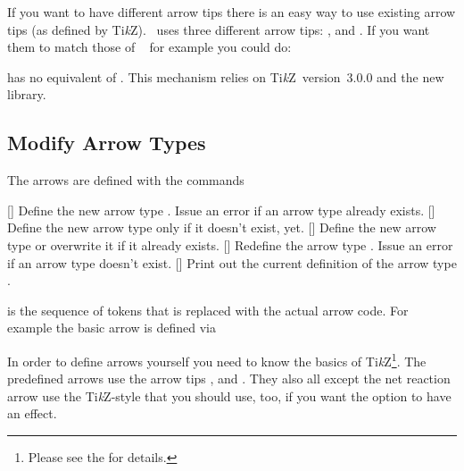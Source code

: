 \documentclass[load-preamble+]{cnltx-doc}
\newcommand*\TikZ{Ti\textit{k}Z}
\begin{document}
If you want to have different arrow tips there is an easy
way to use existing arrow tips (as defined by \TikZ).  \chemformula\ uses
three different arrow tips: ,  and .  If
you want them to match those of ~\cite{pkg:chemfig} for example
you could do:
\begin{sourcecode}
\end{sourcecode}
 has no equivalent of .  This mechanism relies on
\TikZ\ version~3.0.0 and the new  library.

\subsection{Modify Arrow Types}\label{sec:arrows_modify}
The arrows are defined with the commands
\begin{commands}
  [\marg{\TikZ}]
    Define the new arrow type .  Issue an error if an arrow type
     already exists.
  [\marg{\TikZ}]
    Define the new arrow type  only if it
    doesn't exist, yet.
  [\marg{\TikZ}]
    Define the new arrow type  or overwrite it if it already
    exists.
  [\marg{\TikZ}]
    Redefine the arrow type .  Issue an error if an arrow type
     doesn't exist.
  []
    Print out the current definition of the arrow type .
\end{commands}
 is the sequence of tokens that is replaced with the actual arrow
code.  For example the basic arrow is defined via
\begin{sourcecode}
\end{sourcecode}
In order to define arrows yourself you need to know the basics of
\TikZ\footnote{Please see the  for details.}.  The
predefined arrows use the arrow tips ,  and .  They also all except the net reaction arrow \code{==} use the
\TikZ-style  that you should use, too, if you want the option
 to have an effect.
\end{document}
